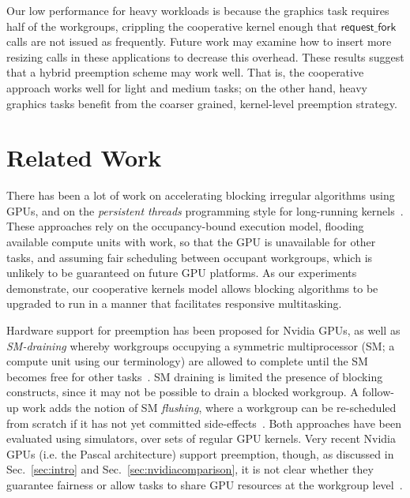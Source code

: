 \documentclass[sigconf]{acmart}
\newcommand{\ADComment}[1]{\textcolor{green}{AD: #1}}
\newcommand{\mysec}{Sec.~}
\newcommand{\nvidia}{Nvidia\xspace}
\newcommand{\offerfork}{\mathsf{request\_fork}}
\begin{document}
{Our low performance for heavy workloads is because the graphics task
requires half of the workgroups, crippling the cooperative kernel
enough that $\offerfork$ calls are not issued as frequently.  Future
work may examine how to insert more resizing calls in these
applications to decrease this overhead.
%
These results suggest that a hybrid preemption scheme may work
well. That is, the cooperative approach works well for light and
medium tasks; on the other hand, heavy graphics tasks benefit from the
coarser grained, kernel-level preemption strategy.

\section{Related Work}\label{sec:relatedwork}

%
There has been a lot of work on accelerating blocking irregular
algorithms using GPUs, and on the \emph{persistent threads}
programming style for long-running
kernels~\cite{owens-persistent,DBLP:conf/ipps/KaleemVPHP16,DBLP:conf/ipps/DavidsonBGO14,DBLP:conf/hipc/HarishN07,DBLP:journals/topc/MerrillGG15,DBLP:conf/egh/VineetHPN09,DBLP:conf/ppopp/NobariCKB12,DBLP:conf/hpcc/SolomonTT10a,DBLP:conf/popl/PrabhuRMH11,DBLP:conf/ppopp/Mendez-LojoBP12,DBLP:conf/oopsla/PaiP16,DBLP:conf/oopsla/SorensenDBGR16,DBLP:conf/egh/CedermanT08,TPO10,BNP12,Pannotia}.
These approaches rely on the occupancy-bound execution model, flooding
available compute units with work, so that the GPU is unavailable for
other tasks, and assuming fair scheduling between occupant workgroups,
which is unlikely to be guaranteed on future GPU platforms.
%
As our experiments demonstrate, our cooperative kernels model allows blocking algorithms
to be upgraded to run in a manner that facilitates responsive multitasking.


%
%
Hardware support for preemption has been proposed for \nvidia GPUs, as
well as \emph{SM-draining} whereby workgroups occupying a symmetric
multiprocessor (SM; a compute unit using our terminology) are allowed
to complete until the SM becomes free for other
tasks~\cite{DBLP:conf/isca/TanasicGCRNV14}.  SM draining is limited
the presence of blocking constructs, since it may not be possible to
drain a blocked workgroup.
%
A follow-up work adds the notion of SM \emph{flushing}, where a
workgroup can be re-scheduled from scratch if it has not yet committed
side-effects~\cite{DBLP:conf/asplos/ParkPM15}.  Both approaches have
been evaluated using simulators, over sets of regular GPU kernels.
Very recent \nvidia GPUs (i.e. the Pascal architecture) support
preemption, though, as discussed in \mysec{\ref{sec:intro}} and
\mysec{\ref{sec:nvidiacomparison}}, it is not clear whether they guarantee
fairness or allow tasks to share GPU resources at the workgroup
level~\cite{PascalWhitepaper}.

}
\end{document}
